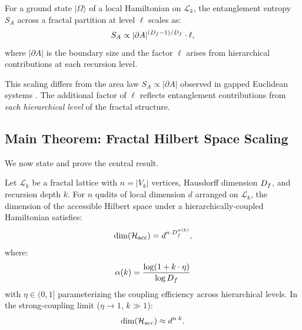 \begin{proposition}
\label{prop:entropy}
For a ground state $|\Omega\rangle$ of a local Hamiltonian on
$\mathcal{L}_k$, the entanglement entropy $S_A$ across a fractal
partition at level $\ell$ scales as:
\begin{equation}
S_A \propto |\partial A|^{(D_f - 1)/D_f} \cdot \ell,
\label{eq:entropy_scaling}
\end{equation}
where $|\partial A|$ is the boundary size and the factor $\ell$ arises
from hierarchical contributions at each recursion level.
\end{proposition}

This scaling differs from the area law $S_A \propto |\partial A|$ observed
in gapped Euclidean systems \cite{Eisert2010}. The additional factor of
$\ell$ reflects entanglement contributions from \emph{each hierarchical
level} of the fractal structure.

\subsection{Main Theorem: Fractal Hilbert Space Scaling}

We now state and prove the central result.

\begin{theorem}
\label{thm:main}
Let $\mathcal{L}_k$ be a fractal lattice with $n = |V_k|$ vertices,
Hausdorff dimension $D_f$, and recursion depth $k$. For $n$ qudits of
local dimension $d$ arranged on $\mathcal{L}_k$, the dimension of the
accessible Hilbert space under a hierarchically-coupled Hamiltonian
satisfies:
\begin{equation}
\dim(\mathcal{H}_{\mathrm{acc}}) = d^{n \cdot D_f^{\alpha(k)}},
\label{eq:main_theorem}
\end{equation}
where:
\begin{equation}
\alpha(k) = \frac{\log(1 + k \cdot \eta)}{\log D_f}
\label{eq:alpha_def}
\end{equation}
with $\eta \in (0, 1]$ parameterizing the coupling efficiency across
hierarchical levels. In the strong-coupling limit ($\eta \to 1$,
$k \gg 1$):
\begin{equation}
\dim(\mathcal{H}_{\mathrm{acc}}) \approx d^{n \cdot k}.
\label{eq:strong_coupling}
\end{equation}
\end{theorem}

